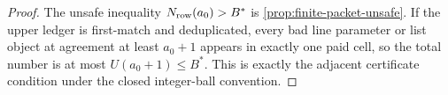 \begin{proof}
The unsafe inequality \(N_{\rm row}(a_0)>B^*\) is
\cref{prop:finite-packet-unsafe}.  If the upper ledger is first-match and
deduplicated, every bad line parameter or list object at agreement at least
\(a_0+1\) appears in exactly one paid cell, so the total number is at most
\(U(a_0+1)\le B^*\).  This is exactly the adjacent certificate condition under
the closed integer-ball convention.
\end{proof}
